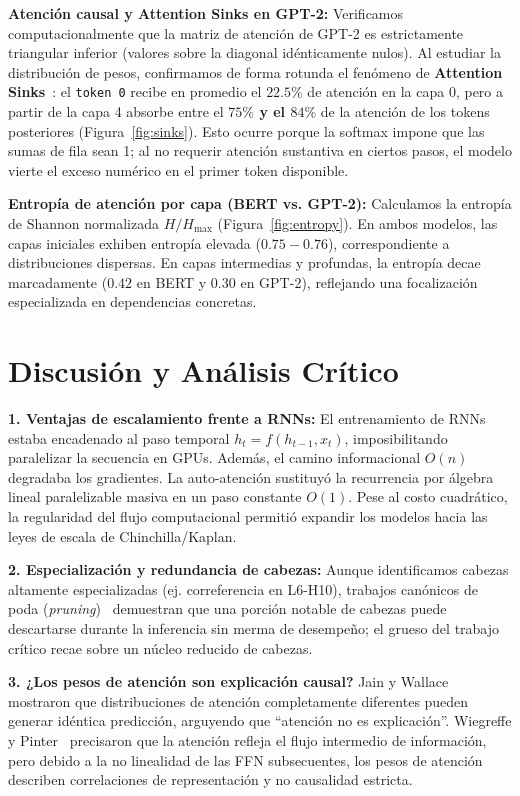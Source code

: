 \documentclass[10pt,letterpaper]{article}
\begin{document}
\textbf{Atención causal y Attention Sinks en GPT-2:}
Verificamos computacionalmente que la matriz de atención de \textsc{GPT-2} es estrictamente triangular inferior (valores sobre la diagonal idénticamente nulos). Al estudiar la distribución de pesos, confirmamos de forma rotunda el fenómeno de \textbf{Attention Sinks}~\cite{xiao2023efficient}: el \texttt{token 0} recibe en promedio el $22.5\%$ de atención en la capa 0, pero a partir de la capa 4 absorbe entre el \textbf{$75\%$ y el $84\%$} de la atención de los tokens posteriores (Figura~\ref{fig:sinks}). Esto ocurre porque la softmax impone que las sumas de fila sean 1; al no requerir atención sustantiva en ciertos pasos, el modelo vierte el exceso numérico en el primer token disponible.

\textbf{Entropía de atención por capa (BERT vs. GPT-2):}
Calculamos la entropía de Shannon normalizada $H/H_{\max}$ (Figura~\ref{fig:entropy}). En ambos modelos, las capas iniciales exhiben entropía elevada ($0.75-0.76$), correspondiente a distribuciones dispersas. En capas intermedias y profundas, la entropía decae marcadamente ($0.42$ en BERT y $0.30$ en GPT-2), reflejando una focalización especializada en dependencias concretas.

\section{Discusión y Análisis Crítico}
\label{sec:discusion}

\textbf{1. Ventajas de escalamiento frente a RNNs:}
El entrenamiento de RNNs estaba encadenado al paso temporal $h_t = f(h_{t-1}, x_t)$, imposibilitando paralelizar la secuencia en GPUs. Además, el camino informacional $O(n)$ degradaba los gradientes. La auto-atención sustituyó la recurrencia por álgebra lineal paralelizable masiva en un paso constante $O(1)$. Pese al costo cuadrático, la regularidad del flujo computacional permitió expandir los modelos hacia las leyes de escala de Chinchilla/Kaplan.

\textbf{2. Especialización y redundancia de cabezas:}
Aunque identificamos cabezas altamente especializadas (ej. correferencia en L6-H10), trabajos canónicos de poda (\textit{pruning})~\cite{voita2019analyzing} demuestran que una porción notable de cabezas puede descartarse durante la inferencia sin merma de desempeño; el grueso del trabajo crítico recae sobre un núcleo reducido de cabezas.

\textbf{3. ¿Los pesos de atención son explicación causal?}
Jain y Wallace~\cite{jain2019attention} mostraron que distribuciones de atención completamente diferentes pueden generar idéntica predicción, arguyendo que ``atención no es explicación''. Wiegreffe y Pinter~\cite{wiegreffe2019attention} precisaron que la atención refleja el flujo intermedio de información, pero debido a la no linealidad de las FFN subsecuentes, los pesos de atención describen correlaciones de representación y no causalidad estricta.
\end{document}

